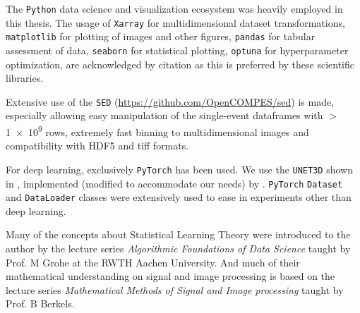 The \texttt{Python} data science and visualization ecosystem was heavily employed in this thesis.
The usage of \texttt{Xarray} \cite{hoyerXarrayNDLabeled2017} for multidimensional dataset transformations, \texttt{matplotlib} \cite{hunterMatplotlib2DGraphics2007} for plotting of images and other figures, \texttt{pandas} \cite{thepandasdevelopmentteamPandasdevPandasPandas2024} for tabular assessment of data, \texttt{seaborn} \cite{waskomSeabornStatisticalData2021} for statistical plotting, \texttt{optuna} \cite{akibaOptunaNextgenerationHyperparameter2019} for hyperparameter optimization, are acknowledged by citation as this is preferred by these scientific libraries. 

Extensive use of the \texttt{SED} (\href{https://github.com/OpenCOMPES/sed}{https://github.com/OpenCOMPES/sed}) is made, especially allowing easy manipulation of the single-event dataframes with $>$\num{1e9} rows, extremely fast binning to multidimensional images and compatibility with HDF5 and tiff formats.

For deep learning, exclusively \texttt{PyTorch} \cite{paszkePyTorchImperativeStyle2019} has been used. We use the \texttt{UNET3D} shown in \cite{cicek3DUNetLearning2016}, implemented (modified to accommodate our needs) by \citeauthor{wolnyAccurateVersatile3D2020} \cite{wolnyAccurateVersatile3D2020}. \texttt{PyTorch} \texttt{Dataset} and \texttt{DataLoader} classes were extensively used to ease in experiments other than deep learning.

Many of the concepts about Statistical Learning Theory were introduced to the author by the lecture series \textit{Algorithmic Foundations of Data Science} taught by Prof. M Grohe at the RWTH Aachen University. And much of their mathematical understanding on signal and image processing is based on the lecture series \textit{Mathematical Methods of Signal and Image processing} taught by Prof. B Berkels.
